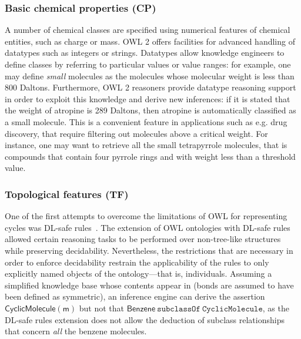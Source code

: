 \documentclass[10pt]{bmc_article}
\newenvironment{bmcformat}{\baselineskip20pt\sloppy\setboolean{publ}{false}}{\baselineskip20pt\sloppy}
\begin{document}
\begin{bmcformat}
\subsubsection*{Basic chemical properties (CP)}

A number of chemical classes are specified using numerical features of chemical entities, such as charge or mass. OWL 2
offers facilities for advanced handling of datatypes such as integers or strings. Datatypes allow knowledge engineers to define classes by referring to particular values or value ranges: for example, one may define \emph{small} molecules as the molecules whose molecular weight is less than 800 Daltons. 
Furthermore, OWL 2 reasoners provide datatype reasoning support~\cite{Motik2008} in order to exploit this knowledge and derive new inferences: if it is stated that the weight of atropine is 289 Daltons, then atropine is automatically classified as a small molecule. 
This is a convenient feature in applications such as e.g. drug discovery, that require filtering out molecules above a critical weight. For instance, one may want to retrieve all the small tetrapyrrole molecules, that is compounds that contain four pyrrole rings and with weight less than a threshold value.%

\subsubsection*{Topological features (TF)}
\label{subsubsec:cycles}

One of the first attempts to overcome the limitations of OWL for representing cycles was DL-safe rules~\cite{DLSafeBoris}. The extension of OWL ontologies with DL-safe rules allowed certain reasoning tasks to be performed over non-tree-like structures while preserving decidability. Nevertheless, the restrictions that are necessary in order to enforce decidability restrain the applicability of the rules to only explicitly named objects of the ontology---that is, individuals. Assuming a simplified knowledge base whose contents appear in \textit{} (bonds are assumed to have been defined as symmetric), %
an inference engine can derive the assertion $\mathsf{CyclicMolecule(m)}$ but not that $\mathsf{Benzene} ~\texttt{subclassOf} ~\texttt{CyclicMolecule}$, as the DL-safe rules extension does not allow the deduction of subclass relationships that concern \emph{all} the benzene molecules. 


\end{bmcformat}
\end{document}
